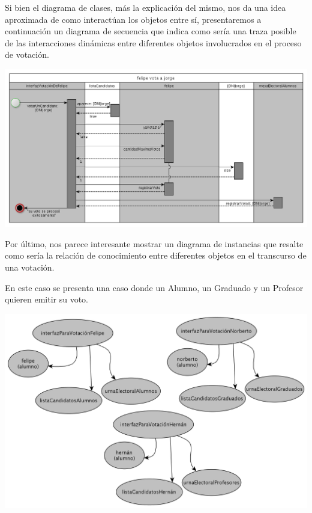 \bigskip

Si bien el diagrama de clases, m\'as la explicaci\'on del mismo, nos da una idea aproximada de como interact\'uan los objetos entre s\'i, presentaremos a continuaci\'on un diagrama de secuencia que indica como ser\'ia una traza posible de las interacciones din\'amicas entre diferentes objetos involucrados en el proceso de votaci\'on.

\begin{center}
\includegraphics[scale=0.4]{diagramas/diagramaSecuenciaVotaUnAlumno.png}
\end{center}


\bigskip

Por \'ultimo, nos parece interesante mostrar un diagrama de instancias que resalte como ser\'ia la relaci\'on de conocimiento entre diferentes objetos en el transcurso de una votaci\'on.

En este caso se presenta una caso donde un Alumno, un Graduado y un Profesor quieren emitir su voto.

\begin{center}
\includegraphics[scale=0.25]{diagramas/modeloDeObjetosVotacion.png}
\end{center}


